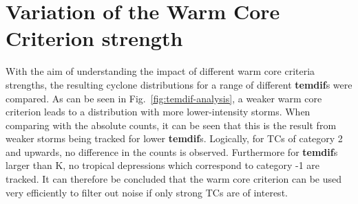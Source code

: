 \section{Variation of the Warm Core Criterion strength}
With the aim of understanding the impact of different warm core criteria strengths, the resulting cyclone distributions for a range of different \textbf{temdif}s were compared. As can be seen in Fig.~\ref{fig:temdif-analysis}, a weaker warm core criterion leads to a distribution with more lower-intensity storms. When comparing with the absolute counts, it can be seen that this is the result from weaker storms being tracked for lower \textbf{temdif}s. Logically, for TCs of category 2 and upwards, no difference in the counts is observed. Furthermore for \textbf{temdif}s larger than \unit[1]{K}, no tropical depressions which correspond to category -1 are tracked. It can therefore be concluded that the warm core criterion can be used very efficiently to filter out noise if only strong TCs are of interest.
